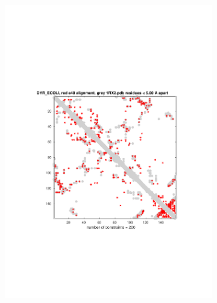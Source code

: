 \documentclass[11pt]{article}\usepackage[]{graphicx}\usepackage[]{color}
\theoremstyle{plain}
\begin{document}
\begin{multicols*}{2}
\begin{figure}[p]
\begin{subfigure}[b]{.49\textwidth}
      \includegraphics[width=\textwidth, trim= 2cm 7cm 2cm 0cm, clip]{../figures/DYR_ECOLI_e3_n2_m40_FPplot}
      \caption{ }
      \label{fig:fig3}
    \end{subfigure}~
      \begin{subfigure}[b]{.5\textwidth}

\end{subfigure}
\end{figure}
\end{multicols*}
\end{document}
